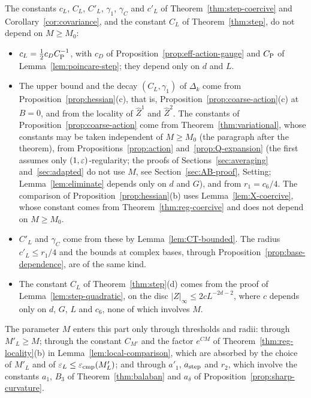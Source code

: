 \begin{remark}\label{rem:step-M}
The constants $c_L$, $C_L$, $C'_L$, $\gamma_1$, $\gamma_C$ and $c'_L$ of Theorem~\ref{thm:step-coercive} and Corollary~\ref{cor:covariance}, and the constant $C_L$ of Theorem~\ref{thm:step}, do not depend on $M\ge M_0$:
\begin{itemize}
\item $c_L=\frac12c_DC_{\rm P}^{-1}$, with $c_D$ of Proposition~\ref{prop:eff-action-gauge} and $C_{\rm P}$ of Lemma~\ref{lem:poincare-step}; they depend only on $d$ and $L$.
\item The upper bound and the decay $(C_L,\gamma_1)$ of $\Delta_k$ come from Proposition~\ref{prop:hessian}(c), that is, Proposition~\ref{prop:coarse-action}(c) at $B=0$, and from the locality of $\hat Z^1$ and $\hat Z^2$. The constants of Proposition~\ref{prop:coarse-action} come from Theorem~\ref{thm:variational}, whose constants may be taken independent of $M\ge M_0$ (the paragraph after the theorem), from Propositions~\ref{prop:action} and~\ref{prop:Q-expansion} (the first assumes only $(1,\varepsilon)$-regularity; the proofs of Sections~\ref{sec:averaging} and~\ref{sec:adapted} do not use $M$, see Section~\ref{sec:AB-proof}, Setting; Lemma~\ref{lem:eliminate} depends only on $d$ and $G$), and from $r_1=c_6/4$. The comparison of Proposition~\ref{prop:hessian}(b) uses Lemma~\ref{lem:X-coercive}, whose constant comes from Theorem~\ref{thm:reg-coercive} and does not depend on $M\ge M_0$.
\item $C'_L$ and $\gamma_C$ come from these by Lemma~\ref{lem:CT-bounded}. The radius $c'_L\le r_1/4$ and the bounds at complex bases, through Proposition~\ref{prop:base-dependence}, are of the same kind.
\item The constant $C_L$ of Theorem~\ref{thm:step}(d) comes from the proof of Lemma~\ref{lem:step-quadratic}, on the disc $|Z|_\infty\le2cL^{-2d-2}$, where $c$ depends only on $d$, $G$, $L$ and $c_6$, none of which involves $M$.
\end{itemize}
The parameter $M$ enters this part only through thresholds and radii: through $M'_L\ge M$; through the constant $C_{M'}$ and the factor $e^{CM}$ of Theorem~\ref{thm:reg-locality}(b) in Lemma~\ref{lem:local-comparison}, which are absorbed by the choice of $M'_L$ and of $\varepsilon_L\le\varepsilon_{\rm cmp}(M'_L)$; and through $a'_1$, $a_{\rm step}$ and $r_2$, which involve the constants $a_1$, $B_3$ of Theorem~\ref{thm:balaban} and $a_\delta$ of Proposition~\ref{prop:sharp-curvature}.
\end{remark}

